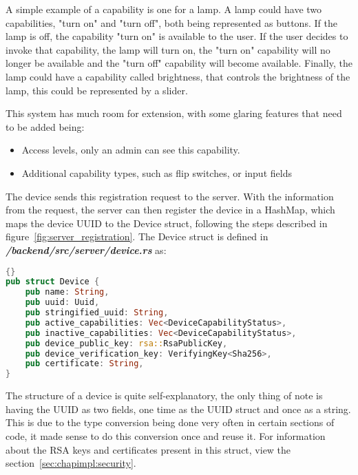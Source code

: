 A simple example of a capability is one for a lamp. A lamp could have two capabilities, "turn on" and "turn off", both being represented as buttons. If the lamp is off, the capability "turn on" is available to the user. If the user decides to invoke that capability, the lamp will turn on, the "turn on" capability will no longer be available and the "turn off" capability will become available. Finally, the lamp could have a capability called brightness, that controls the brightness of the lamp, this could be represented by a slider.

This system has much room for extension, with some glaring features that need to be added being:
\begin{itemize}
    \item Access levels, only an admin can see this capability.
    \item Additional capability types, such as flip switches, or input fields
\end{itemize}

The device sends this registration request to the server. With the information from the request, the server can then register the device in a HashMap, which maps the device UUID to the Device struct, following the steps described in figure~\ref{fig:server_registration}. The Device struct is defined in \textit{\textbf{/backend/src/server/device.rs}} as:
\begin{lstlisting}[language=Rust, style=boxed, showstringspaces=false]{}
pub struct Device {
    pub name: String,
    pub uuid: Uuid,
    pub stringified_uuid: String,
    pub active_capabilities: Vec<DeviceCapabilityStatus>,
    pub inactive_capabilities: Vec<DeviceCapabilityStatus>,
    pub device_public_key: rsa::RsaPublicKey,
    pub device_verification_key: VerifyingKey<Sha256>,
    pub certificate: String,
}
\end{lstlisting}
The structure of a device is quite self-explanatory, the only thing of note is having the UUID as two fields, one time as the UUID struct and once as a string. This is due to the type conversion being done very often in certain sections of code, it made sense to do this conversion once and reuse it. For information about the RSA keys and certificates present in this struct, view the section~\ref{sec:chapimpl:security}. 

